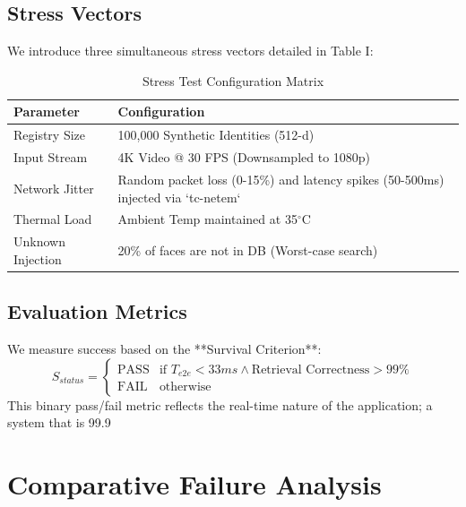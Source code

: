 \documentclass[conference]{IEEEtran}
\begin{document}
\subsection{Stress Vectors}
We introduce three simultaneous stress vectors detailed in Table I:

\begin{table}[htbp]
\caption{Stress Test Configuration Matrix}
\begin{center}
\begin{tabular}{l p{5cm}}
\toprule
\textbf{Parameter} & \textbf{Configuration} \\
\midrule
Registry Size & 100,000 Synthetic Identities (512-d) \\
Input Stream & 4K Video @ 30 FPS (Downsampled to 1080p) \\
Network Jitter & Random packet loss (0-15\%) and latency spikes (50-500ms) injected via `tc-netem` \\
Thermal Load & Ambient Temp maintained at 35$^\circ$C \\
Unknown Injection & 20\% of faces are not in DB (Worst-case search) \\
\bottomrule
\end{tabular}
\end{center}
\label{tab:stress}
\end{table}

\subsection{Evaluation Metrics}
We measure success based on the **Survival Criterion**:
\begin{equation}
S_{status} = 
\begin{cases} 
\text{PASS} & \text{if } T_{e2e} < 33ms \land \text{Retrieval Correctness} > 99\% \\
\text{FAIL} & \text{otherwise}
\end{cases}
\end{equation}
This binary pass/fail metric reflects the real-time nature of the application; a system that is 99.9%

\section{Comparative Failure Analysis}
\end{document}

